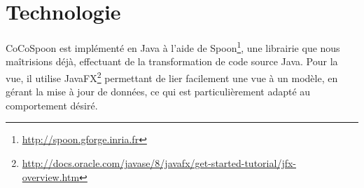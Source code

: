 \section{Technologie}
CoCoSpoon est implémenté en Java à l'aide de Spoon\footnote{\url{http://spoon.gforge.inria.fr}}, une librairie que nous maîtrisions déjà, effectuant de la transformation de code source Java. Pour la vue, il utilise JavaFX\footnote{\url{http://docs.oracle.com/javase/8/javafx/get-started-tutorial/jfx-overview.htm}} permettant de lier facilement une vue à un modèle, en gérant la mise à jour de données, ce qui est particulièrement adapté au comportement désiré. 